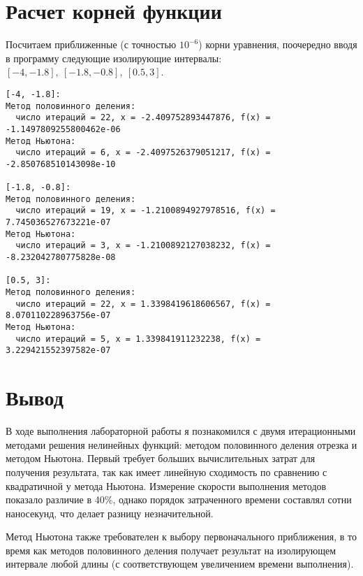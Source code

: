 \documentclass[listings]{labreport}
\begin{document}
\newpage
\section*{Расчет корней функции}

Посчитаем приближенные (с точностью $10^{-6}$) корни уравнения, поочередно
вводя в программу следующие изолирующие интервалы: $[-4, -1.8],\ [-1.8, -0.8],\ [0.5, 3]$.

\begin{verbatim}
[-4, -1.8]:
Метод половинного деления:
  число итераций = 22, x = -2.409752893447876, f(x) = -1.1497809255800462e-06
Метод Ньютона:
  число итераций = 6, x = -2.4097526379051217, f(x) = -2.850768510143098e-10

[-1.8, -0.8]:
Метод половинного деления:
  число итераций = 19, x = -1.2100894927978516, f(x) = 7.745036527673221e-07
Метод Ньютона:
  число итераций = 3, x = -1.2100892127038232, f(x) = -8.232042780775828e-08

[0.5, 3]:
Метод половинного деления:
  число итераций = 22, x = 1.3398419618606567, f(x) = 8.070110228963756e-07
Метод Ньютона:
  число итераций = 5, x = 1.339841911232238, f(x) = 3.229421552397582e-07
\end{verbatim}

\section*{Вывод}

В ходе выполнения лабораторной работы я познакомился с двумя итерационными
методами решения нелинейных функций: методом половинного деления отрезка и
методом Ньютона. Первый требует б\textit{о}льших вычислительных затрат для
получения результата, так как имеет линейную сходимость по сравнению с
квадратичной у метода Ньютона. Измерение скорости выполнения методов показало
различие в 40\%, однако порядок затраченного времени составлял сотни
наносекунд, что делает разницу незначительной.

Метод Ньютона также требователен к выбору первоначального приближения, 
в то время как методов половинного деления получает результат на изолирующем
интервале любой длины (с соответствующем увеличением времени выполнения).
\end{document}
